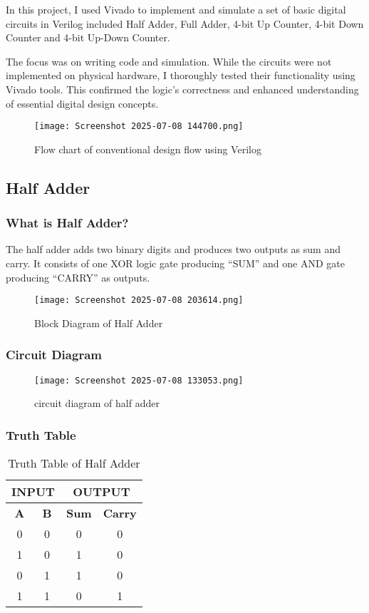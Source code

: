 \documentclass[12pt]{article}
\begin{document}
In this project, I used Vivado to implement and simulate a set of basic digital circuits in Verilog included Half Adder, Full Adder, 4-bit Up Counter, 4-bit Down Counter and 4-bit Up-Down Counter.

The focus was on writing code and simulation. While the circuits were not implemented on physical hardware, I thoroughly tested their functionality using Vivado tools. This confirmed the logic’s correctness and enhanced understanding of essential digital design concepts.
\begin{figure}[H]
    \centering
    \texttt{[image: Screenshot 2025-07-08 144700.png]}
    \caption{Flow chart of conventional design flow using Verilog }
    \label{fig:enter-label}
\end{figure}

\subsection{Half Adder}
\subsubsection{What is Half Adder?}
The half
adder adds two binary digits and produces two outputs as
sum and carry. It consists of one XOR logic gate producing
“SUM” and one AND gate producing “CARRY” as outputs.
\begin{figure}[H]
    \centering
    \texttt{[image: Screenshot 2025-07-08 203614.png]}
    \caption{Block Diagram of Half Adder}
    \label{fig:enter-label}
\end{figure}
\subsubsection{Circuit Diagram}
\begin{figure}[H]
    \centering
    \texttt{[image: Screenshot 2025-07-08 133053.png]}
    \caption{circuit diagram of half adder}
    \label{fig:enter-label}
\end{figure}
\subsubsection{Truth Table}
\begin{table}[H]
\centering
\begin{tabular}{|c|c|c|c|}
\hline
\multicolumn{2}{|c|}{\textbf{INPUT}} & \multicolumn{2}{c|}{\textbf{OUTPUT}} \\ \hline
\textbf{A} & \textbf{B} & \textbf{Sum} & \textbf{Carry} \\ \hline
0 & 0 & 0 & 0 \\ \hline
1 & 0 & 1 & 0 \\ \hline
0 & 1 & 1 & 0 \\ \hline
1 & 1 & 0 & 1 \\ \hline
\end{tabular}
\caption{Truth Table of Half Adder}
\end{table}
\end{document}
